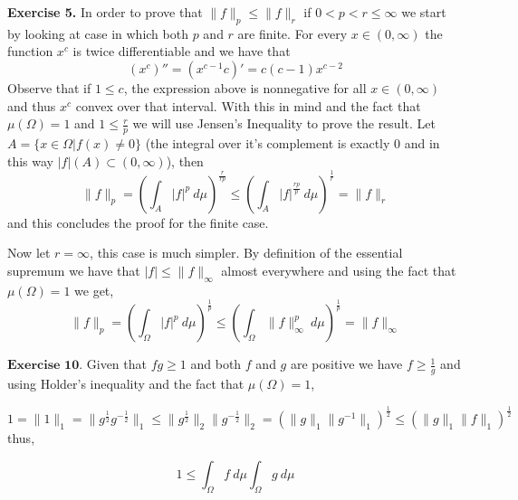 \documentclass{article}
\begin{document}
\begin{exercise}\textbf{Exercise 5.}
    In order to prove that $ \|f\|_p \le \|f\|_r$ if $0 < p < r \le \infty$ we start by looking at case in which both $p$ and $r$ are finite. For every $x \in \left( 0,\infty \right) $ the function $x^{c}$ is twice differentiable and we have that
    \[
        \left( x^c \right)'' = \left( x^{c-1}c \right) ' = c \left( c-1 \right) x^{c-2}
    \]
    Observe that if $1 \le c$, the expression above is nonnegative for all $x \in \left( 0,\infty \right)$ and thus $x^c$ convex over that interval. With this in mind and the fact that $\mu \left( \Omega \right) = 1$ and $1 \le \frac{r}{p}$ we will use Jensen's Inequality to prove the result. Let $A = \{x \in \Omega | f \left( x \right) \neq 0 \}$ (the integral over it's complement is exactly $0$ and in this way $|f| \left( A \right) \subset \left( 0,\infty \right)$), then  
    \[
        \|f\|_p = \left( \int_A |f|^p\: d\mu  \right)^{\frac{r}{rp}} \le \left( \int_A |f|^{\frac{rp}{p}}\: d\mu  \right)^\frac{1}{r} = \|f\|_r 
    \]
    and this concludes the proof for the finite case.

    Now let $r = \infty$, this case is much simpler. By definition of the essential supremum we have that $|f| \le \|f\|_\infty $ almost everywhere and using the fact that $\mu \left( \Omega \right) = 1$ we get,
    \[
        \|f\|_p = \left( \int_\Omega |f|^p\: d\mu  \right)^\frac{1}{p} \le \left( \int_\Omega \|f\|_\infty^p \: d\mu  \right) ^\frac{1}{p} = \|f\|_\infty 
    \]
    
\end{exercise}

\bigbreak

\begin{exercise}$\textbf{Exercise 10.}$
Given that $fg\ge1$ and both $f$ and $g$ are positive we have $f \ge \frac{1}{g}$ and using Holder's inequality and the fact that $\mu\left(\Omega\right)=1$,

\[
    1 = \|1\|_1 = \|g^{\frac{1}{2}}g^{-\frac{1}{2}}\|_1 \le \|g^{\frac{1}{2}}\|_2 \|g^{-\frac{1}{2}}\|_2 =  \left( \|g\|_1 \|g^{-1}\|_1 \right) ^{\frac{1}{2}} \le \left(\|g\|_1 \|f\|_1 \right)^{\frac{1}{2}} 
\]
thus,

\[
    1 \le \int_\Omega f\: d\mu \int_\Omega g\: d\mu  
\]

\end{exercise}
\end{document}
